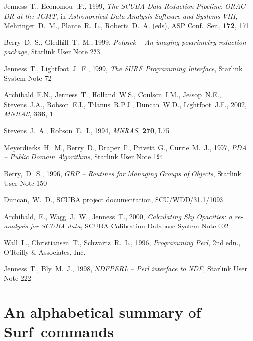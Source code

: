 \documentclass[twoside,11pt]{article}
\newcommand{\scusoft}          {{\sc Surf}}
\newcommand{\htmladdnormallink}[2]{#1}
\newcommand{\xref}[3]{#1}
\newcommand{\xlabel}[1]{}
\renewcommand{\_}{\texttt{\symbol{95}}}
\begin{document}
\begin{thebibliography}{}
Jenness~T., Economou~.F., 1999, \textit{The SCUBA Data Reduction Pipeline:
ORAC-DR at the JCMT}, in \textit{Astronomical Data Analysis Software and
Systems VIII}, Mehringer~D.~M., Plante~R.~L., Roberts~D.~A. (eds),
ASP Conf.\ Ser., \textbf{172}, 171


Berry~D.~S., Gledhill~T.~M., 1999, 
\textit{Polpack -- An imaging polarimetry reduction package},
\xref{Starlink User Note 223}{sun223}{}

Jenness~T., Lightfoot~J.~F., 1999, {\it The SURF Programming Interface},
\xref{Starlink System Note 72}{ssn72}{}

Archibald~E.N., Jenness~T., Holland~W.S., Coulson~I.M., Jessop~N.E.,
Stevens~J.A., Robson~E.I., Tilanus~R.P.J., Duncan~W.D., Lightfoot~J.F., 2002,
\textit{MNRAS}, \textbf{336}, 1 


Stevens~J.~A.,  Robson~E.~I.,  1994, {\it  MNRAS}, {\bf 270}, L75


Meyerdierks~H.~M., Berry~D., Draper~P., Privett~G., Currie~M.~J., 1997,
\textit{PDA -- Public Domain Algorithms}, 
\xref{Starlink User Note 194}{sun194}{}

Berry,~D.~S., 1996, 
\textit{GRP -- Routines for Managing Groups of Objects},
\xref{Starlink User Note 150}{sun150}{}

Duncan,~W.~D., SCUBA project documentation, SCU/WDD/31.1/1093

Archibald,~E., Wagg~J.~W., Jenness~T., 2000, 
\textit{Calculating Sky Opacities: a re-analysis for SCUBA data},
SCUBA Calibration Database System Note 002

Wall~L., Christiansen~T., Schwartz~R.~L., 1996, 
\htmladdnormallink{\textit{Programming Perl}}{http://www.perl.org/}, 2nd
edn., \htmladdnormallink{O'Reilly \& Associates, Inc.}{http://www.ora.com/}

Jenness~T., Bly~M.~J., 1998,
\textit{NDFPERL -- Perl interface to NDF},
\xref{Starlink User Note 222}{sun222}{}

\end{thebibliography}


\appendix

\clearpage

\section{\xlabel{alphabet}An alphabetical summary of \scusoft\ commands\label{alphabet}}
\end{document}
